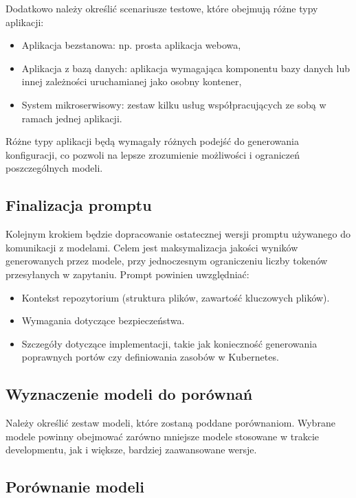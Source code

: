 Dodatkowo należy określić scenariusze testowe, które obejmują różne typy aplikacji:

\begin{itemize}
    \item Aplikacja bezstanowa: np. prosta aplikacja webowa,
    \item Aplikacja z bazą danych: aplikacja wymagająca komponentu bazy danych lub innej zależności uruchamianej jako osobny kontener,
    \item System mikroserwisowy: zestaw kilku usług współpracujących ze sobą w ramach jednej aplikacji.
\end{itemize}

Różne typy aplikacji będą wymagały różnych podejść do generowania konfiguracji, co pozwoli na lepsze zrozumienie możliwości i ograniczeń poszczególnych modeli.

\subsection{Finalizacja promptu}

Kolejnym krokiem będzie dopracowanie ostatecznej wersji promptu używanego do komunikacji z modelami. Celem jest maksymalizacja jakości wyników generowanych przez modele, przy jednoczesnym ograniczeniu liczby tokenów przesyłanych w zapytaniu. Prompt powinien uwzględniać:

\begin{itemize}
    \item Kontekst repozytorium (struktura plików, zawartość kluczowych plików).
    \item Wymagania dotyczące bezpieczeństwa.
    \item Szczegóły dotyczące implementacji, takie jak konieczność generowania poprawnych portów czy definiowania zasobów w Kubernetes.
\end{itemize}

\subsection{Wyznaczenie modeli do porównań}

Należy określić zestaw modeli, które zostaną poddane porównaniom. Wybrane modele powinny obejmować zarówno mniejsze modele stosowane w trakcie developmentu, jak i większe, bardziej zaawansowane wersje.

\subsection{Porównanie modeli}

